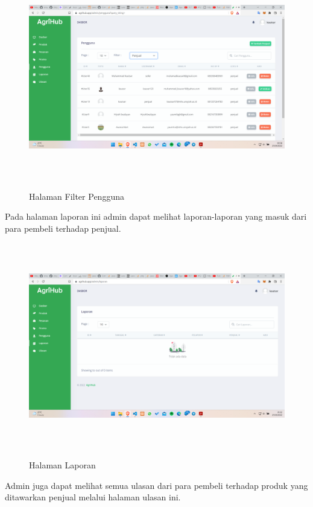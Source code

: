 \begin{enumerate}
\begin{enumerate}
			\begin{figure}[H]
				\centering
				{\includegraphics [width = 14.3cm, height= 9cm]{gambar/admin/filter_pengguna}}
				\caption{Halaman Filter Pengguna}
				\label{filter_pengguna}
			\end{figure}

			\par Pada halaman laporan ini admin dapat melihat laporan-laporan yang masuk dari para pembeli terhadap penjual.

			\begin{figure}[H]
				\centering
				{\includegraphics [width = 14.3cm, height= 9cm]{gambar/admin/laporan}}
				\caption{Halaman Laporan}
				\label{laporan}
			\end{figure}

			\par Admin juga dapat melihat semua ulasan dari para pembeli terhadap produk yang ditawarkan penjual melalui halaman ulasan ini.


\end{enumerate}
\end{enumerate}
